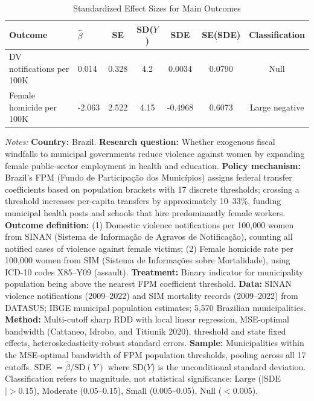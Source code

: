 \begin{table}[H]
\centering
\caption{Standardized Effect Sizes for Main Outcomes}
\label{tab:sde}
\begin{threeparttable}
\begin{tabular}{llccccc}
\toprule
Outcome & $\hat{\beta}$ & SE & SD($Y$) & SDE & SE(SDE) & Classification \\
\midrule
DV notifications per 100K & 0.014 & 0.328 & 4.2 & 0.0034 & 0.0790 & Null \\
Female homicide per 100K & -2.063 & 2.522 & 4.15 & -0.4968 & 0.6073 & Large negative \\
\bottomrule
\end{tabular}
\begin{tablenotes}[flushleft]
\small
\item \textit{Notes:} \textbf{Country:} Brazil. \textbf{Research question:} Whether exogenous fiscal windfalls to municipal governments reduce violence against women by expanding female public-sector employment in health and education. \textbf{Policy mechanism:} Brazil's FPM (Fundo de Participa\c{c}\~{a}o dos Munic\'{i}pios) assigns federal transfer coefficients based on population brackets with 17 discrete thresholds; crossing a threshold increases per-capita transfers by approximately 10--33\%, funding municipal health posts and schools that hire predominantly female workers. \textbf{Outcome definition:} (1) Domestic violence notifications per 100,000 women from SINAN (Sistema de Informa\c{c}\~{a}o de Agravos de Notifica\c{c}\~{a}o), counting all notified cases of violence against female victims; (2) Female homicide rate per 100,000 women from SIM (Sistema de Informa\c{c}\~{o}es sobre Mortalidade), using ICD-10 codes X85--Y09 (assault). \textbf{Treatment:} Binary indicator for municipality population being above the nearest FPM coefficient threshold. \textbf{Data:} SINAN violence notifications (2009--2022) and SIM mortality records (2009--2022) from DATASUS; IBGE municipal population estimates; 5,570 Brazilian municipalities. \textbf{Method:} Multi-cutoff sharp RDD with local linear regression, MSE-optimal bandwidth (Cattaneo, Idrobo, and Titiunik 2020), threshold and state fixed effects, heteroskedasticity-robust standard errors. \textbf{Sample:} Municipalities within the MSE-optimal bandwidth of FPM population thresholds, pooling across all 17 cutoffs. SDE $= \hat{\beta} / \text{SD}(Y)$ where SD($Y$) is the unconditional standard deviation. Classification refers to magnitude, not statistical significance: Large ($|$SDE$| > 0.15$), Moderate ($0.05$--$0.15$), Small ($0.005$--$0.05$), Null ($< 0.005$).
\end{tablenotes}
\end{threeparttable}
\end{table}

